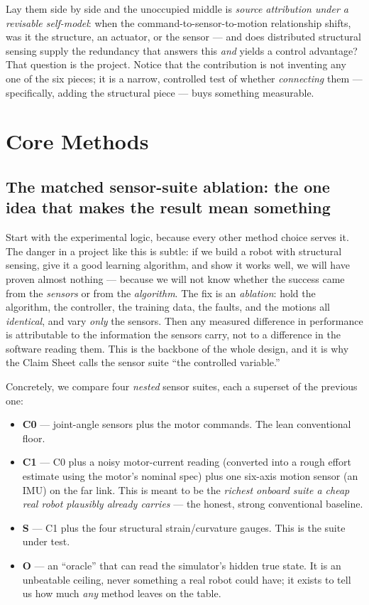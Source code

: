\documentclass[12pt]{article}
\begin{document}
Lay them side by side and the unoccupied middle is \emph{source attribution under a revisable self-model}: when the command-to-sensor-to-motion relationship shifts, was it the structure, an actuator, or the sensor --- and does distributed structural sensing supply the redundancy that answers this \emph{and} yields a control advantage? That question is the project. Notice that the contribution is not inventing any one of the six pieces; it is a narrow, controlled test of whether \emph{connecting} them --- specifically, adding the structural piece --- buys something measurable.

\section{Core Methods}

\subsection{The matched sensor-suite ablation: the one idea that makes the result mean something}

Start with the experimental logic, because every other method choice serves it. The danger in a project like this is subtle: if we build a robot with structural sensing, give it a good learning algorithm, and show it works well, we will have proven almost nothing --- because we will not know whether the success came from the \emph{sensors} or from the \emph{algorithm}. The fix is an \emph{ablation}: hold the algorithm, the controller, the training data, the faults, and the motions all \emph{identical}, and vary \emph{only} the sensors. Then any measured difference in performance is attributable to the information the sensors carry, not to a difference in the software reading them. This is the backbone of the whole design, and it is why the Claim Sheet calls the sensor suite ``the controlled variable.''

Concretely, we compare four \emph{nested} sensor suites, each a superset of the previous one:

\begin{itemize}
  \item \textbf{C0} --- joint-angle sensors plus the motor commands. The lean conventional floor.
  \item \textbf{C1} --- C0 plus a noisy motor-current reading (converted into a rough effort estimate using the motor's nominal spec) plus one six-axis motion sensor (an IMU) on the far link. This is meant to be the \emph{richest onboard suite a cheap real robot plausibly already carries} --- the honest, strong conventional baseline.
  \item \textbf{S} --- C1 plus the four structural strain/curvature gauges. This is the suite under test.
  \item \textbf{O} --- an ``oracle'' that can read the simulator's hidden true state. It is an unbeatable ceiling, never something a real robot could have; it exists to tell us how much \emph{any} method leaves on the table.
\end{itemize}
\end{document}
